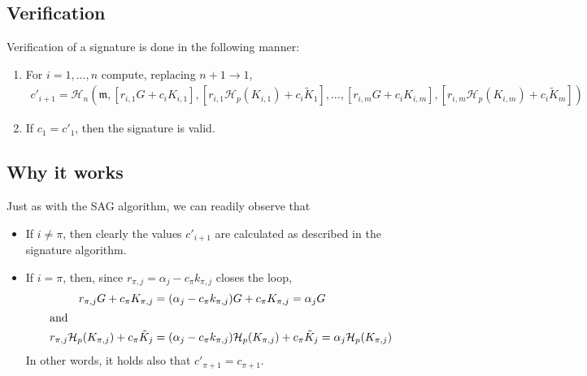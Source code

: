 

\subsection*{Verification}

Verification of a signature is done in the following manner:

\begin{enumerate}
	\item For \(i = 1, ..., n\) compute, replacing \(n + 1 \rightarrow 1\),\vspace{.175cm}
	\begin{align*}
	c'_{i+1} = \mathcal{H}_n(\mathfrak{m}, [r_{i, 1} G + c_i K_{i, 1}], [r_{i, 1} \mathcal{H}_p(K_{i, 1}) + c_i \tilde{K}_1], 
	..., [r_{i, m} G + c_i K_{i, m}], [r_{i, m} \mathcal{H}_p(K_{i, m}) + c_i \tilde{K}_m])
	\end{align*}

	\item If \(c_1 = c'_1\), then the signature is valid.
\end{enumerate}


\subsection*{Why it works}

Just as with the SAG algorithm, we can readily observe that

\begin{itemize}
    \item If \(i \ne \pi \), then clearly the values \(c'_{i + 1}\) are calculated as described in the signature algorithm.

    \item If \(i = \pi\), then, since \(r_{\pi, j} = \alpha_j - c_\pi k_{\pi, j} \) closes the loop,\vspace{.175cm}
    \begin{alignat*}{6}
        r_{\pi, j} G + c_\pi K_{\pi,j} &= (\alpha_j - c_\pi k_{\pi, j}) G + c_\pi K_{\pi,j} = \alpha_j G\\
        \intertext{and}
        r_{\pi, j} \mathcal{H}_p(K_{\pi, j}) + c_\pi \tilde{K}_j &= (\alpha_j - c_\pi k_{\pi, j}) \mathcal{H}_p(K_{\pi, j}) + c_\pi \tilde{K}_j = \alpha_j \mathcal{H}_p(K_{\pi, j})\\
    \end{alignat*}
    In other words, it holds also that \(c'_{\pi + 1} = c_{\pi+1}\).
\end{itemize}



